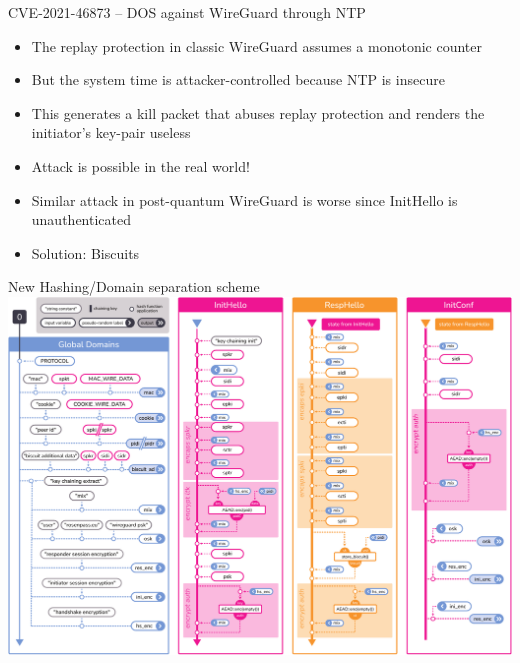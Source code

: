 \documentclass{rosenpass-beamer}
\begin{document}
\begin{frame}{CVE-2021-46873 – DOS against WireGuard through NTP}
\begin{itemize}
  \item The replay protection in classic WireGuard assumes a monotonic counter
  \item But the system time is attacker-controlled because NTP is insecure
  \item This generates a kill packet that abuses replay protection and renders the initiator's key-pair useless
  \item Attack is possible in the real world!
  \item Similar attack in post-quantum WireGuard is worse since InitHello is unauthenticated
  \item Solution: Biscuits
\end{itemize}
\end{frame}

\begin{frame}{New Hashing/Domain separation scheme}
  \includegraphics[height=.9\textheight]{graphics/rosenpass-wp-hashing-tree.pdf}
\end{frame}

\printbibliography
\end{document}
